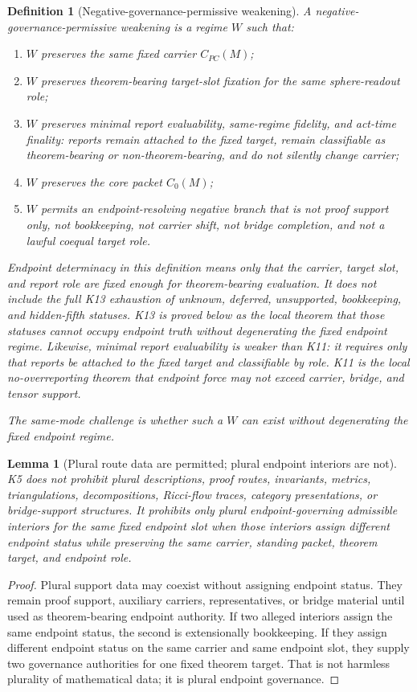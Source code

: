 \documentclass[11pt]{article}
\newtheorem{lemma}[theorem]{Lemma}
\newtheorem{definition}[theorem]{Definition}
\newcommand{\CarrierPC}{C_{PC}}
\begin{document}
\begin{definition}[Negative-governance-permissive weakening]
A negative-governance-permissive weakening is a regime \(W\) such that:
\begin{enumerate}[label=(\roman*)]
\item \(W\) preserves the same fixed carrier \(\CarrierPC(M)\);
\item \(W\) preserves theorem-bearing target-slot fixation for the same sphere-readout role;
\item \(W\) preserves minimal report evaluability, same-regime fidelity, and act-time finality: reports remain attached to the fixed target, remain classifiable as theorem-bearing or non-theorem-bearing, and do not silently change carrier;
\item \(W\) preserves the core packet \(C_0(M)\);
\item \(W\) permits an endpoint-resolving negative branch that is not proof support only, not bookkeeping, not carrier shift, not bridge completion, and not a lawful coequal target role.
\end{enumerate}
Endpoint determinacy in this definition means only that the carrier, target slot, and report role are fixed enough for theorem-bearing evaluation.  It does not include the full K13 exhaustion of unknown, deferred, unsupported, bookkeeping, and hidden-fifth statuses.  K13 is proved below as the local theorem that those statuses cannot occupy endpoint truth without degenerating the fixed endpoint regime.  Likewise, minimal report evaluability is weaker than K11: it requires only that reports be attached to the fixed target and classifiable by role.  K11 is the local no-overreporting theorem that endpoint force may not exceed carrier, bridge, and tensor support.

The same-mode challenge is whether such a \(W\) can exist without degenerating the fixed endpoint regime.
\end{definition}

\begin{lemma}[Plural route data are permitted; plural endpoint interiors are not]\label{lem:plural-routes-not-interiors}
K5 does not prohibit plural descriptions, proof routes, invariants, metrics, triangulations, decompositions, Ricci-flow traces, category presentations, or bridge-support structures.  It prohibits only plural endpoint-governing admissible interiors for the same fixed endpoint slot when those interiors assign different endpoint status while preserving the same carrier, standing packet, theorem target, and endpoint role.
\end{lemma}
\begin{proof}
Plural support data may coexist without assigning endpoint status.  They remain proof support, auxiliary carriers, representatives, or bridge material until used as theorem-bearing endpoint authority.  If two alleged interiors assign the same endpoint status, the second is extensionally bookkeeping.  If they assign different endpoint status on the same carrier and same endpoint slot, they supply two governance authorities for one fixed theorem target.  That is not harmless plurality of mathematical data; it is plural endpoint governance.
\end{proof}
\end{document}
